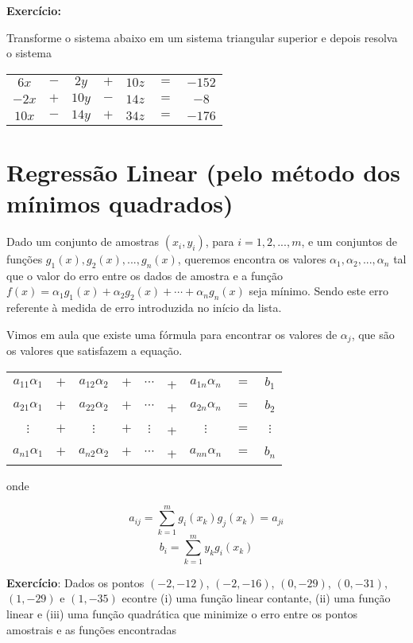 \documentclass[12pt]{article}
\begin{document}
\textbf{Exercício: }

Transforme o sistema abaixo em um sistema triangular superior e depois resolva o sistema

\begin{tabular}{ccccccc}
$  6x$ & $-$ & $ 2y$ & $+$ & $10z$ & $=$ & $-152$\\
$ -2x$ & $+$ & $10y$ & $-$ & $14z$ & $=$ & $-8$\\
$ 10x$ & $-$ & $14y$ & $+$ & $34z$ & $=$ & $-176$
\end{tabular}





\break





\section{Regressão Linear (pelo método dos mínimos quadrados)}

Dado um conjunto de amostras $(x_i, y_i)$, para $i = 1, 2, ..., m$, e um conjuntos de funções $g_1(x), g_2(x), ..., g_n(x)$, queremos encontra os valores $\alpha_1, \alpha_2, ..., \alpha_n$ tal que o valor do erro entre os dados de amostra e a função $f(x) = \alpha_1g_1(x) + \alpha_2g_2(x) + \cdots + \alpha_ng_n(x)$ seja mínimo. Sendo este erro referente à medida de erro introduzida no início da lista.

Vimos em aula que existe uma fórmula para encontrar os valores de $\alpha_j$, que são os valores que satisfazem a equação.

\begin{tabular}{ccccccccc}
   $a_{11}\alpha_1$ & $+$ & $a_{12}\alpha_2$ & $+$ & $\cdots$ & + & $a_{1n}\alpha_n$ & $=$ & $b_1$ \\
   $a_{21}\alpha_1$ & $+$ & $a_{22}\alpha_2$ & $+$ & $\cdots$ & + & $a_{2n}\alpha_n$ & $=$ & $b_2$ \\
   $\vdots$         & $+$ & $\vdots$         & $+$ & $\vdots$ & + &         $\vdots$ & $=$ &$\vdots$ \\
   $a_{n1}\alpha_1$ & $+$ & $a_{n2}\alpha_2$ & $+$ & $\cdots$ & + & $a_{nn}\alpha_n$ & $=$ & $b_n$ 
\end{tabular}

onde 


\[a_{ij} = \sum_{k=1}^{m}g_i(x_k)g_j(x_k) = a_{ji}\]
\[b_i = \sum_{k=1}^{m}y_kg_i(x_k)\]


\textbf{Exercício}: Dados os pontos $(-2, -12)$, $(-2, -16)$, $(0, -29)$, $(0, -31)$, $(1, -29)$ e $(1, -35)$ econtre (i) uma função linear contante, (ii) uma função linear e (iii) uma função quadrática que minimize o erro entre os pontos  amostrais e as funções encontradas
\end{document}
